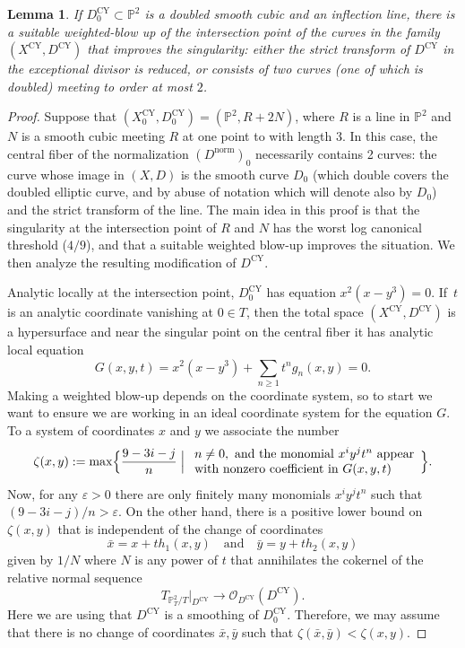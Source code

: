 \documentclass[JEP,XML,SOM,Unicode,NoFloatCountersInSection,published]{cedram}
\let\epsilon\varepsilon
\theoremstyle{plain}
\newtheorem{lemma}[theorem]{Lemma}
\theoremstyle{definition}
\newcommand\PP{{\mathbb{P}}}
\newcommand\Oc{{\mathcal O}}
\newcommand\Dcy{{D^{\mathrm{CY}}}}
\newcommand\Dcyo{{D^{\mathrm{CY}}_0}}
\newcommand\Dnorm{{D^{\mathrm{norm}}}}
\newcommand\Dnormo{{(\Dnorm)_0}}
\newcommand\Xcy{{X^{\mathrm{CY}}}}
\newcommand\Xcyo{{X^{\mathrm{CY}}_0}}
\newcommand\xbar{{\bar{x}}}
\newcommand\ybar{{\bar{y}}}
\begin{document}
\begin{lemma}\label{lem:4/9canmodel}
If $\Dcyo \subset \PP^2$ is a doubled smooth cubic and an inflection line, there is a suitable weighted-blow up of the intersection point of the curves in the family $(\Xcy, \Dcy)$ that improves the singularity: either the strict transform of $\Dcy$ in the exceptional divisor is reduced, or consists of two curves (one of which is doubled) meeting to order at most $2$.
\end{lemma}

\begin{proof}
Suppose that $(\Xcyo, \Dcyo) = (\PP^2, R+2N)$, where $R$ is a line in $\PP^2$ and $N$ is a smooth cubic meeting $R$ at one point to with length 3. In this case, the central fiber of the normalization $\Dnormo$ necessarily contains 2 curves: the curve whose image in $(X,D)$ is the smooth curve $D_0$ (which double covers the doubled elliptic curve, and by abuse of notation which will denote also by $D_0$) and the strict transform of the line. The main idea in this proof is that the singularity at the intersection point of $R$ and $N$ has the worst log canonical threshold ($4/9$), and that a suitable weighted blow-up improves the situation. We then analyze the resulting modification of $\Dcy$.

Analytic locally at the intersection point, $\Dcyo$ has equation $x^2(x-y^3)=0$. If~$t$ is an analytic coordinate vanishing at $0\in T$, then the total space $(\Xcy,\Dcy)$ is a hypersurface and near the singular point on the central fiber it has analytic local equation
\[
G(x,y,t) = x^2(x-y^3) + \sum_{n \ge 1} t^n g_n(x,y) = 0.
\]
Making a weighted blow-up depends on the coordinate system, so to start we want to ensure we are working in an ideal coordinate system for the equation $G$. To a system of coordinates $x$ and $y$ we associate the number
\[
\zeta(x,y) := \max\Bigl\{\frac{9-3i-j}{n} \Bigm| \begin{array}{l}
n\ne 0,\text{ and the monomial }x^iy^jt^n\text{ appear}\\
\text{with nonzero coefficient in }G(x,y,t) \end{array}\Bigr\}.
\]
Now, for any $\epsilon>0$ there are only finitely many monomials $x^iy^jt^n$ such that \hbox{$(9-3i-j)/n>\epsilon$}. On the other hand, there is a positive lower bound on $\zeta(x,y)$ that is independent of the change of coordinates
\[
\xbar = x+t h_1(x,y)\quad\text{and}\quad \ybar = y+th_2(x,y)
\]
given by $1/N$ where $N$ is any power of $t$ that annihilates the cokernel of the relative normal sequence
\[
T_{\PP^2_T/T}|_\Dcy\to \Oc_\Dcy(\Dcy).
\]
Here we are using that $\Dcy$ is a smoothing of $\Dcyo$. Therefore, we may assume that there is no change of coordinates $\xbar,\ybar$ such that $\zeta(\xbar,\ybar)<\zeta(x,y)$.


\end{proof}
\end{document}
